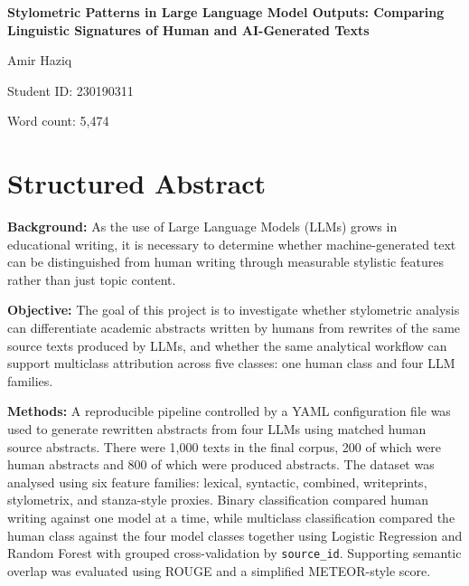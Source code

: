 \documentclass[12pt,a4paper]{article}
\begin{document}
\begin{titlepage}
\centering
\vspace*{\fill}

{\LARGE \textbf{Stylometric Patterns in Large Language Model Outputs: Comparing Linguistic Signatures of Human and AI-Generated Texts}\par}

\vspace{1.5cm}

{\Large Amir Haziq\par}

\vspace{1cm}

{\large Student ID: 230190311\par}
{\large Word count: 5,474\par}

\vspace*{\fill}
\end{titlepage}

\section*{Structured Abstract}

\textbf{Background:} As the use of Large Language Models (LLMs) grows in educational writing, it is necessary to determine whether machine-generated text can be distinguished from human writing through measurable stylistic features rather than just topic content.

\textbf{Objective:} The goal of this project is to investigate whether stylometric analysis can differentiate academic abstracts written by humans from rewrites of the same source texts produced by LLMs, and whether the same analytical workflow can support multiclass attribution across five classes: one human class and four LLM families.

\textbf{Methods:} A reproducible pipeline controlled by a YAML configuration file was used to generate rewritten abstracts from four LLMs using matched human source abstracts. There were 1,000 texts in the final corpus, 200 of which were human abstracts and 800 of which were produced abstracts. The dataset was analysed using six feature families: lexical, syntactic, combined, writeprints, stylometrix, and stanza-style proxies. Binary classification compared human writing against one model at a time, while multiclass classification compared the human class against the four model classes together using Logistic Regression and Random Forest with grouped cross-validation by \texttt{source\_id}. Supporting semantic overlap was evaluated using ROUGE and a simplified METEOR-style score.
\end{document}
